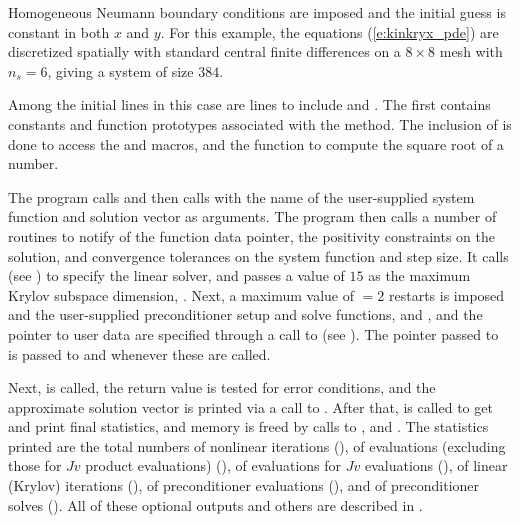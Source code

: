 Homogeneous Neumann boundary conditions are imposed and the initial
guess is constant in both $x$ and $y$. For this example, the equations
(\ref{e:kinkryx_pde}) are discretized spatially with standard central finite
differences on a $8 \times 8$ mesh with $n_s = 6$, giving a system of size $384$.

Among the initial  lines in this case are lines to
include  and .  The first contains
constants and function prototypes associated with the {\spgmr} method.
The inclusion of  is done to access the  and
 macros, and the  function to compute the square root
of a  number.

The  program calls  and then calls  with the
name of the user-supplied system function  and solution vector as
arguments.  The  program then calls a number of 
routines to notify {\kinsol} of the function data pointer, the
positivity constraints on the solution, and convergence tolerances on
the system function and step size.
It calls   (see ) to specify the {\kinspgmr} 
linear solver, and passes a  value of $15$ as the maximum Krylov subspace dimension,
.  Next, a maximum value of  $=2$ restarts is imposed and
the user-supplied preconditioner setup and solve functions,  and
, and the pointer to user data are specified through a call to
 (see ).
The  pointer passed to  is passed to  
and  whenever these are called. 

Next,  is called, the return value is tested for error conditions, and
the approximate solution vector is printed via a call to .
After that,  is called to get and print final statistics, and
memory is freed by calls to ,  and .
The statistics printed are the total numbers of nonlinear iterations (),
of  evaluations (excluding those for $Jv$ product evaluations) (),
of  evaluations for $Jv$ evaluations (), of linear (Krylov)
iterations (), of preconditioner evaluations (), and of
preconditioner solves (). All of these optional outputs and others are
described in .

